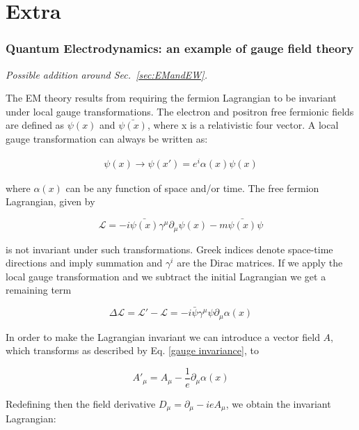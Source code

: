\chapter{Extra}

\subsection{Quantum Electrodynamics: an example of gauge field theory }

{\em Possible addition around Sec.~\ref{sec:EMandEW}.}



The EM theory results from requiring the fermion Lagrangian to be invariant under local gauge transformations.
The electron and positron free fermionic fields are defined as $\psi(x)$ and $\bar{\psi(x)}$, where x is a relativistic four vector.
A local gauge transformation can always be written as:

\begin{align}
\psi(x) \rightarrow \psi(x') = e^i{\alpha(x)}\psi(x)
\end{align}

where $\alpha(x)$ can be any function of space and/or time. The free fermion Lagrangian, given by

\begin{equation}
\mathcal{L} = -i \bar{\psi(x)} \gamma^{\mu} \partial_\mu \psi(x) - m\bar{\psi(x)} \psi
\end{equation}

is not invariant under such transformations. Greek indices denote space-time directions and imply summation and $\gamma^i$ are the Dirac matrices. If we apply the local gauge transformation and we subtract the initial Lagrangian we get a remaining term

\begin{equation}
\Delta \mathcal{L} = \mathcal{L}' - \mathcal{L} = -i \bar{\psi}  \gamma^{\mu} \psi \partial_\mu \alpha(x)
\end{equation}

In order to make the Lagrangian invariant we can introduce a vector field $A$, which transforms as described by Eq. \ref{gauge invariance},  to %

\begin{equation}
\label{gauge invariance}
A'_\mu = A_\mu -\frac{1}{e}\partial_\mu \alpha(x)
\end{equation}

Redefining then the field derivative $D_\mu = \partial_\mu - ieA_\mu$, we obtain the invariant Lagrangian:


